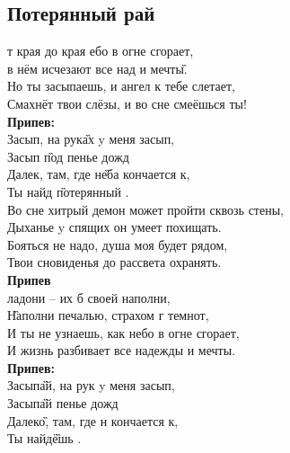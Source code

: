 \documentclass[fleqn,a5paper,12pt,twoside]{guitartabs}
\newcommand{\musVspace}{\vspace{2mm}}
\begin{document}
\subsection*{Потерянный рай}
\vspace{-4.0mm}
    \begin{spacing}{0.9}
    т края до края ебо в огне сгорает,\\
     в нём исчезают все над и мечт\G{ы}.\\
     Но ты засыпаешь, и ангел к тебе слетает,\\
    Смахнёт твои слёзы, и во сне смеёшься ты!\musVspace\\
    \-\hspace{10mm}\textbf{Припев:}\vspace{-2mm}\\
    \-\hspace{10mm}Засып, на рук\G{ах} y меня засып,\\
    \-\hspace{10mm}Засып \G{под} пенье дожд\\
    \-\hspace{10mm}Далек, там, где н\G{еба} кончается к,\\
    \-\hspace{10mm}Ты найд \G{потерянный} .\musVspace\\
    Во сне хитрый демон может пройти сквозь стены,\\
    Дыханье y спящих он умеет похищать.\\
    Бояться не надо, душа моя будет рядом,\\
    Твои сновиденья до рассвета охранять.\musVspace\\
    \-\hspace{10mm}\textbf{Припев} \vspace{-2mm}\\
     ладони -- их б своей наполни,\\
    \G{Наполни} печалью, страхом г темнот,\\
    И ты не узнаешь, как небо в огне сгорает,\\
    И жизнь разбивает все надежды и мечты.\musVspace\\
    \-\hspace{10mm}\textbf{Припев:}\vspace{-2mm}\\
    \-\hspace{10mm}Засып\G{ай}, на рук y меня засып,\\
    \-\hspace{10mm}Засып\G{ай}  пенье дожд\\
    \-\hspace{10mm}Далек\G{о}, там, где н кончается к,\\
    \-\hspace{10mm}Ты найд\G{ёшь}  .
    \end{spacing}
\newpage
\end{document}
